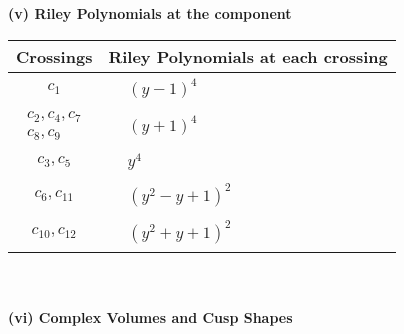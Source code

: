 \documentclass[1p]{elsarticle_modified}
\theoremstyle{definition}
\begin{document}
\newpage\renewcommand{\arraystretch}{1}
\flushleft \textbf{(v) Riley Polynomials at the component}\newline \\
\begin{tabular}{m{50pt}|m{274pt}}
Crossings & \hspace{64pt}Riley Polynomials at each crossing \\
\hline $$\begin{aligned}c_{1}\end{aligned}$$&$\begin{aligned}
&(y-1)^4
\end{aligned}$\\
\hline $$\begin{aligned}c_{2},c_{4},c_{7}\\c_{8},c_{9}\end{aligned}$$&$\begin{aligned}
&(y+1)^4
\end{aligned}$\\
\hline $$\begin{aligned}c_{3},c_{5}\end{aligned}$$&$\begin{aligned}
&y^4
\end{aligned}$\\
\hline $$\begin{aligned}c_{6},c_{11}\end{aligned}$$&$\begin{aligned}
&(y^2- y+1)^2
\end{aligned}$\\
\hline $$\begin{aligned}c_{10},c_{12}\end{aligned}$$&$\begin{aligned}
&(y^2+y+1)^2
\end{aligned}$\\
\hline
\end{tabular}\\~\\
\newpage\flushleft \textbf{(vi) Complex Volumes and Cusp Shapes}
\end{document}
